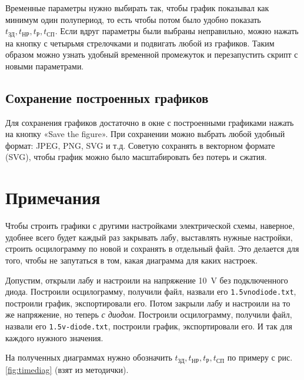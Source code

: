 \documentclass[a4paper,oneside,DIV=10,12pt]{scrartcl}
\newcommand\filename[1]{\texttt{#1}}
\begin{document}
		Временные параметры нужно выбирать так, чтобы график показывал как минимум один полупериод, то есть чтобы потом было удобно показать $t_{\text{ЗД}}, t_{\text{НР}}, t_{\text{Р}}, t_{\text{СП}}$. Если вдруг параметры были выбраны неправильно, можно нажать на кнопку с четырьмя стрелочками и подвигать любой из графиков. Таким образом можно узнать удобный временной промежуток и перезапустить скрипт с новыми параметрами.
		
		\subsection{Сохранение построенных графиков}
		Для сохранения графиков достаточно в окне с построенными графиками нажать на кнопку «Save the figure». При сохранении можно выбрать любой удобный формат: JPEG, PNG, SVG и т.д. Советую сохранять в векторном формате (SVG), чтобы график можно было масштабировать без потерь и сжатия.
	
	\section{Примечания}
		Чтобы строить графики с другими настройками электрической схемы, наверное, удобнее всего будет каждый раз закрывать лабу, выставлять нужные настройки, строить осцилограмму по новой и сохранять в отдельный файл. Это делается для того, чтобы не запутаться в том, какая диаграмма для каких настроек.
		
		Допустим, открыли лабу и настроили на напряжение \SI{10}{\volt} без подключенного диода. Построили осцилограмму, получили файл, назвали его \filename{1.5v\-no\-diode.txt}, построили график, экспортировали его. Потом закрыли лабу и настроили на то же напряжение, но теперь \emph{с диодом}. Построили осцилограмму, получили файл, назвали его \filename{1.5v-diode.txt}, построили график, экспортировали его. И так для каждого нужного значения.
		
		На полученных диаграммах нужно обозначить $t_{\text{ЗД}}, t_{\text{НР}}, t_{\text{Р}}, t_{\text{СП}}$ по примеру с рис. \ref{fig:timediag} (взят из методички). 
		
\end{document}
